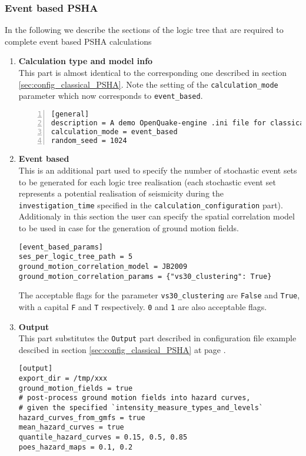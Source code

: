 \subsubsection{Event based PSHA}
%
In the following we describe the sections of the logic tree that are 
required to complete event based PSHA calculations 
\begin{enumerate}
\item \textbf{Calculation type and model info} \hfill \\
    This part is almost identical to the corresponding one 
    described in section \ref{sec:config_classical_PSHA}. Note
    the setting of the \texttt{cal\-cu\-lation\_mode} parameter
    which now corresponds to \texttt{event\_based}.
\begin{Verbatim}[frame=single, commandchars=\\\{\}, fontsize=\small,
    numbers=left, numbersep=2pt]
[general]
description = A demo OpenQuake-engine .ini file for classical PSHA
calculation_mode = event_based
random_seed = 1024
\end{Verbatim}
%
\item \textbf{Event based} \hfill \\
This is an additional part used to specify the number of stochastic 
event sets to be generated for each logic tree realisation 
(each stochastic event set represents a potential realisation of seismicity
during the \texttt{in\-ves\-ti\-gation\_time} specified in the 
\texttt{calculation\_configuration} part).
Additionaly in this section the user can specify the spatial correlation
model to be used in case for the generation of ground motion fields. 
\begin{Verbatim}[frame=single, commandchars=\\\{\}, fontsize=\small]
[event_based_params]
ses_per_logic_tree_path = 5
ground_motion_correlation_model = JB2009
ground_motion_correlation_params = {"vs30_clustering": True}
\end{Verbatim}
The acceptable flags for the parameter \verb+vs30_clustering+ are \verb+False+ 
and \verb+True+, with a capital \verb+F+ and \verb+T+ respectively. \verb+0+ 
and \verb+1+ are also acceptable flags.
%
\item \textbf{Output} \hfill \\
This part substitutes the \texttt{Output} part described in 
configuration file example descibed in section \ref{sec:config_classical_PSHA}
at page \pageref{sec:config_classical_PSHA}.
\begin{Verbatim}[frame=single, commandchars=\\\{\}, fontsize=\small]
[output]
export_dir = /tmp/xxx
ground_motion_fields = true
# post-process ground motion fields into hazard curves,
# given the specified `intensity_measure_types_and_levels`
hazard_curves_from_gmfs = true
mean_hazard_curves = true
quantile_hazard_curves = 0.15, 0.5, 0.85
poes_hazard_maps = 0.1, 0.2
\end{Verbatim}
%
\end{enumerate}
